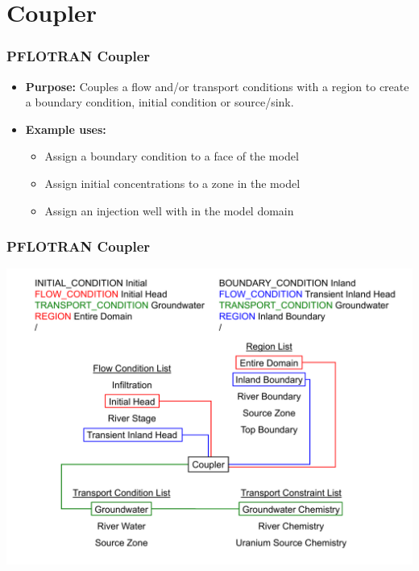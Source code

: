 \section{Coupler}

\begin{frame}\frametitle{PFLOTRAN Coupler}

\begin{itemize}
\item[] \textbf{Purpose:} Couples a flow and/or transport conditions with a region to create a boundary condition, initial condition or source/sink.
\item[] \textbf{Example uses:}
\begin{itemize}
  \item Assign a boundary condition to a face of the model
  \item Assign initial concentrations to a zone in the model
  \item Assign an injection well with in the model domain
\end{itemize}
\end{itemize}
\end{frame}

\begin{frame}\frametitle{PFLOTRAN Coupler}
\includegraphics[width=\linewidth]{coupler.pdf}
\end{frame}
